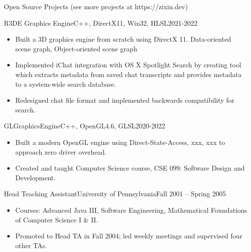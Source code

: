 \documentclass[]{mcdowellcv}
\begin{document}
	\begin{cvsection}{Open Source Projects (see more projects at https://zixin.dev)}
		\begin{cvsubsection}{R3DE Graphics Engine}{C++, DirectX11, Win32, HLSL}{2021-2022}			
			\begin{itemize}
				\item Built a 3D graphics engine from scratch using DirectX 11. Data-oriented scene graph, Object-oriented scene graph
				\item Implemented iChat integration with OS X Spotlight Search by creating tool which extracts metadata from saved chat transcripts and provides metadata to a system-wide search database.
				\item Redesigned chat file format and implemented backwards compatibility for search.
			\end{itemize}
		\end{cvsubsection}
		
		\begin{cvsubsection}{GLGraphicsEngine}{C++, OpenGL4.6, GLSL}{2020-2022}	
			\begin{itemize}
				\item Built a modern OpenGL engine using Direct-State-Access, xxx, xxx to approach zero driver overhead. 
				\item Created and taught Computer Science course, CSE 099: Software Design and Development.
			\end{itemize}
		\end{cvsubsection}
		
		\begin{cvsubsection}{Head Teaching Assistant}{University of Pennsylvania}{Fall 2001 -- Spring 2005}		
			\begin{itemize}
				\item Courses: Advanced Java III, Software Engineering, Mathematical Foundations of Computer Science I \& II.
				\item Promoted to Head TA in Fall 2004; led weekly meetings and supervised four other TAs.
			\end{itemize}
		\end{cvsubsection}
	\end{cvsection}
	
\end{document}
